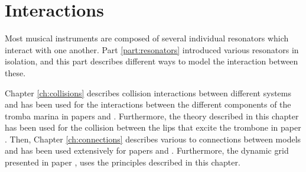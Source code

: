 \chapter*{Interactions}
Most musical instruments are composed of several individual resonators which interact with one another. Part \ref{part:resonators} introduced various resonators in isolation, and this part describes different ways to model the interaction between these. 

Chapter \ref{ch:collisions} describes collision interactions between different systems and has been used for the interactions between the different components of the tromba marina in papers \citeP[D] and \citeP[E]. Furthermore, the theory described in this chapter has been used for the collision between the lips that excite the trombone in paper \citeP[H]. Then, Chapter \ref{ch:connections} describes various to connections between models and has been used extensively for papers \citeP[A] and \citeP[B]. Furthermore, the dynamic grid presented in paper \citeP[G], uses the principles described in this chapter.